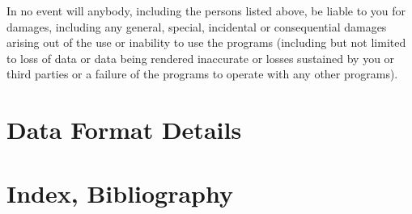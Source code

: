 \documentclass{report}
\begin{document}
In no event will anybody, including the persons listed above, be
liable to you for damages, including any general, special, incidental
or consequential damages arising out of the use or inability to use
the programs (including but not limited to loss of data or data being
rendered inaccurate or losses sustained by you or third parties or a
failure of the programs to operate with any other programs).

\newpage

\tableofcontents
\newpage
\pagestyle{headings}
\setcounter{page}{1}










\clearpage

\clearpage


\clearpage










\chapter{Data Format Details} \label{chap:storage}











\chapter{Index, Bibliography}
\printindex

\end{document}
